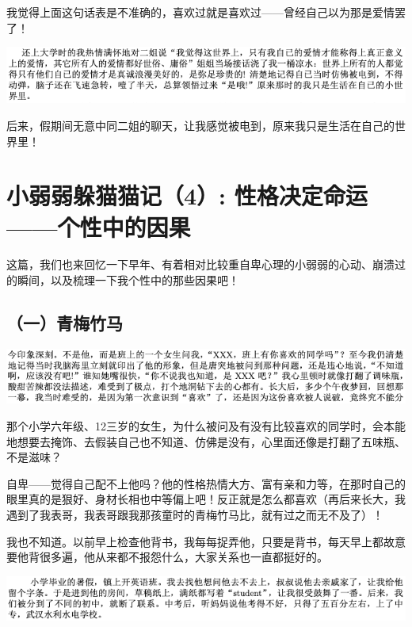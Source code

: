 \documentclass[9pt, b5paper]{article}
\begin{document}
我觉得上面这句话表是不准确的，喜欢过就是喜欢过——曾经自己以为那是爱情罢了！

\begin{center}
\includegraphics[width=.9\linewidth]{./pic/backups_plans_20210422_182414.png}
\end{center}

后来，假期间无意中同二姐的聊天，让我感觉被电到，原来我只是生活在自己的世界里！

\section{小弱弱躲猫猫记（4）: 性格决定命运——个性中的因果}
\label{sec:org82f22e1}

这篇，我们也来回忆一下早年、有着相对比较重自卑心理的小弱弱的心动、崩溃过的瞬间，以及梳理一下我个性中的那些因果吧！

\subsection{（一）青梅竹马}
\label{sec:org7ad8aa9}

\begin{center}
\includegraphics[width=.9\linewidth]{./pic/backups_plans_20210422_105840.png}
\end{center}

那个小学六年级、12三岁的女生，为什么被问及有没有比较喜欢的同学时，会本能地想要去掩饰、去假装自己也不知道、仿佛是没有，心里面还像是打翻了五味瓶、不是滋味？

自卑——觉得自己配不上他吗？他的性格热情大方、富有亲和力等，在那时自己的眼里真的是狠好、身材长相也中等偏上吧！反正就是怎么都喜欢（再后来长大，我遇到了我表哥，我表哥跟我那孩童时的青梅竹马比，就有过之而无不及了）！

我也不知道。以前早上检查他背书，我每每捉弄他，只要是背书，每天早上都故意要他背很多遍，他从来都不报怨什么，大家关系也一直都挺好的。

\begin{center}
\includegraphics[width=.9\linewidth]{./pic/backups_plans_20210422_180800.png}
\end{center}
\end{document}
